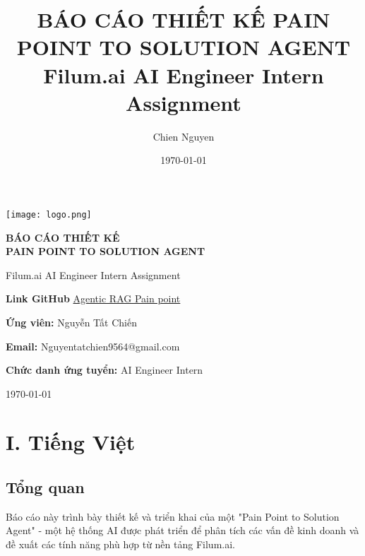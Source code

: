 \documentclass[12pt,a4paper]{article}
\title{\textbf{BÁO CÁO THIẾT KẾ PAIN POINT TO SOLUTION AGENT}\\
\large Filum.ai AI Engineer Intern Assignment}
\author{Chien Nguyen}
\date{\today}
\begin{document}
\begin{titlepage}

 \centering
 \vspace*{2cm}

 \texttt{[image: logo.png]}

 \vspace{2cm}

 {\Large \textbf{BÁO CÁO THIẾT KẾ }}
 \vspace{0.5cm}
 {\Large \textbf{\\PAIN POINT TO SOLUTION AGENT}}
 \vspace{0.5cm}

 {\large Filum.ai AI Engineer Intern Assignment}
\vspace{2cm}

{\large \textbf{Link GitHub } \href{https://github.com/chiennguyen/filum-agent}{Agentic RAG Pain point}}

 \vspace{5cm}

 {\large \textbf{Ứng viên:} Nguyễn Tất Chiến}

 \vspace{0.5cm}

 {\large \textbf{Email:} Nguyentatchien9564@gmail.com}

 \vspace{0.5cm}

 {\large \textbf{Chức danh ứng tuyển:} AI Engineer Intern}

 \vfill

 {\large \today}
\end{titlepage}


\newpage

\tableofcontents
\newpage

\section{I. Tiếng Việt}

\subsection{Tổng quan}

Báo cáo này trình bày thiết kế và triển khai của một "Pain Point to Solution Agent" - một hệ thống AI được phát triển để phân tích các vấn đề kinh doanh và đề xuất các tính năng phù hợp từ nền tảng Filum.ai.
\end{document}

